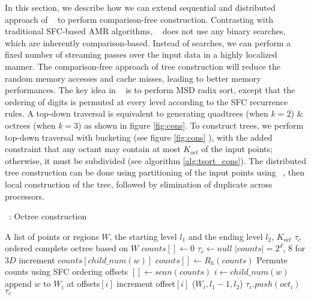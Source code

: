 In this section, we describe how we can extend sequential and distributed approach of \tsort~ to perform comparison-free construction. Contrasting with traditional SFC-based AMR algorithms, \tsort~ does not use any binary searches, which are inherently comparison-based. Instead of searches, we can perform a fixed number of streaming passes over the input data in a highly localized manner. The comparison-free approach of tree construction will reduce the random memory accesses and cache misses, leading to better memory performances. The key idea in \tsort~ is to perform MSD radix sort, except that the ordering of digits is permuted at every level according to the SFC recurrence rules. A top-down traversal is equivalent to generating quadtrees (when $k=2$) \& octrees (when $k=3$) as shown in figure \ref{fig:cons}. To construct trees, we perform top-down traversal with bucketing (see figure \ref{fig:cons} ), with the added constraint that any octant may contain at most $K_{oct}$ of the input points; otherwise, it must be subdivided (see algorithm \ref{alg:tsort_cons}). The distributed tree construction can be done using partitioning of the input points using \tsort~, then local construction of the tree, followed by elimination of duplicate across processors.

\begin{algorithm}[t]
  \caption{\tcons~: Octree construction}\label{alg:tsort_cons}
  \footnotesize
  \begin{algorithmic}[1]
      \Require A list of points or regions $W$, the starting level $l_1$ and the ending level $l_2$, $K_{oct}$
    \Ensure $\tau_c$ \- ordered complete octree based on $W$
    \State $counts [] \leftarrow 0$
    \State $\tau_c \leftarrow null $
    \Comment $|counts| = 2^{d}$, $8$ for $3D$
    \State increment $counts[child\_num(w)]$
    \EndFor
    \State $counts[] \leftarrow R_h(counts)$ 
    \Comment Permute counts using SFC ordering
    \State offsets $ []\leftarrow scan(counts)$
    \State $i\leftarrow child\_num(w)$
    \State append $w$ to $W_i$ at offsets$[i]$
    \State increment offset$[i]$
    \EndFor 
        \State \tcons ($W_i, l_1-1, l_2$) 
      \Else
        \State $\tau_c.push(oct_i)$
      \EndIf  
    \EndFor 
    \EndIf
    \State \Return $\tau_c$
  \end{algorithmic}
\end{algorithm}

